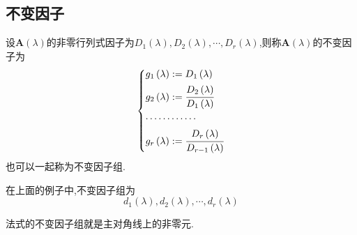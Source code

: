 \subsection{不变因子}
\begin{formal}
\begin{definition}[不变因子]\label{def:不变因子}
    设$\bm{A}\left(\lambda\right)$的非零行列式因子为$D_1\left(\lambda\right),D_2\left(\lambda\right),\cdots,D_r\left(\lambda\right)$,则称$\bm{A}\left(\lambda\right)$的不变因子为
    \[
    \begin{cases*}
    g_1\left(\lambda\right):=D_1\left(\lambda\right)\\
    g_2\left(\lambda\right):=\cfrac{D_2\left(\lambda\right)}{D_1\left(\lambda\right)}\\
    \cdots\cdots\cdots\cdots\\
    g_r\left(\lambda\right):=\cfrac{D_r\left(\lambda\right)}{D_{r-1}\left(\lambda\right)}
    \end{cases*}
    \]也可以一起称为不变因子组.
\end{definition}
\end{formal}
\begin{brown}
\begin{example}
    在上面的例子中,不变因子组为
    \[
    d_1\left(\lambda\right),d_2\left(\lambda\right),\cdots,d_r\left(\lambda\right)
    \]
\end{example}
\end{brown}
\begin{red}
\begin{remark}
    法式的不变因子组就是主对角线上的非零元.
\end{remark}
\end{red}
